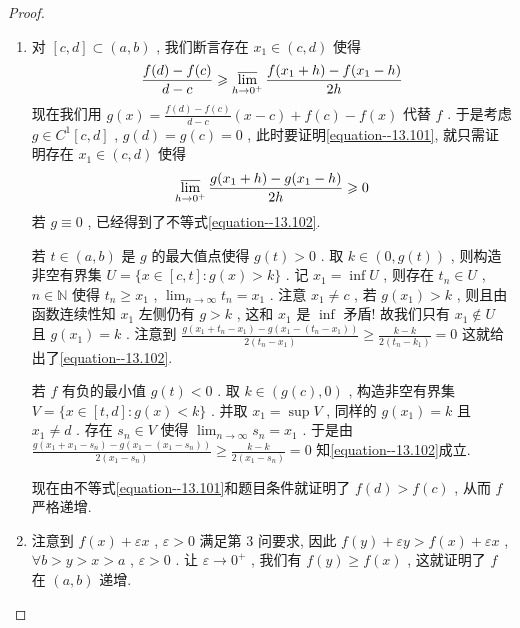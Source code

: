 \documentclass[../../main.tex]{subfiles}
\begin{document}
\begin{proof}
\begin{enumerate}
\item 对 \([c, d] \subset (a, b)\) , 我们断言存在 \(x_1 \in (c, d)\) 使得
\begin{align}
\frac{f(d) - f(c)}{d - c} \geqslant  \varlimsup_{h \to 0^+} \frac{f(x_1 + h) - f(x_1 - h)}{2h} \label{equation--13.101}
\end{align}
现在我们用 \(g(x) = \frac{f(d) - f(c)}{d - c}(x - c) + f(c) - f(x)\) 代替 \(f\) . 于是考虑 \(g \in C^1[c, d]\) , \(g(d) = g(c) = 0\) , 此时要证明\eqref{equation--13.101}, 就只需证明存在 \(x_1 \in (c, d)\) 使得
\begin{align}
\varlimsup_{h \to 0^+} \frac{g(x_1 + h) - g(x_1 - h)}{2h} \geqslant  0 \label{equation--13.102}
\end{align}
若 \(g \equiv 0\) , 已经得到了不等式\eqref{equation--13.102}.

若 \(t \in (a, b)\) 是 \(g\) 的最大值点使得 \(g(t) > 0\) . 取 \(k \in (0, g(t))\) , 则构造非空有界集
\(U = \{x \in [c, t] : g(x) > k\}\) .
记 \(x_1 = \inf U\) , 则存在 \(t_n \in U\) , \(n \in \mathbb{N}\) 使得
\(t_n \geqslant  x_1\) , \(\lim_{n \to \infty} t_n = x_1\) .
注意 \(x_1 \neq c\) , 若 \(g(x_1) > k\) , 则且由函数连续性知 \(x_1\) 左侧仍有 \(g > k\) , 这和 \(x_1\) 是 \(\inf\) 矛盾! 故我们只有 \(x_1 \notin U\) 且 \(g(x_1) = k\) . 注意到
\(\frac{g(x_1 + t_n - x_1) - g(x_1 - (t_n - x_1))}{2(t_n - x_1)} \geqslant  \frac{k - k}{2(t_n - k_1)} = 0\)
这就给出了\eqref{equation--13.102}.

若 \(f\) 有负的最小值 \(g(t) < 0\) . 取 \(k \in (g(c), 0)\) , 构造非空有界集
\(V = \{x \in [t, d] : g(x) < k\}\) .
并取 \(x_1 = \sup V\) , 同样的 \(g(x_1) = k\) 且 \(x_1 \neq d\) . 存在 \(s_n \in V\) 使得 \(\lim_{n \to \infty} s_n = x_1\) . 于是由
\(\frac{g(x_1 + x_1 - s_n) - g(x_1 - (x_1 - s_n))}{2(x_1 - s_n)} \geqslant  \frac{k - k}{2(x_1 - s_n)} = 0\)
知\eqref{equation--13.102}成立.

现在由不等式\eqref{equation--13.101}和题目条件就证明了 \(f(d) > f(c)\) , 从而 \(f\) 严格递增.

\item 注意到 \(f(x) + \varepsilon x\) , \(\varepsilon > 0\) 满足第 3 问要求, 因此
\(f(y) + \varepsilon y > f(x) + \varepsilon x\) , \(\forall b > y > x > a\) , \(\varepsilon > 0\) .
让 \(\varepsilon \to 0^+\) , 我们有 \(f(y) \geqslant  f(x)\) , 这就证明了 \(f\) 在 \((a, b)\) 递增. 
\end{enumerate}

\end{proof}
\end{document}
